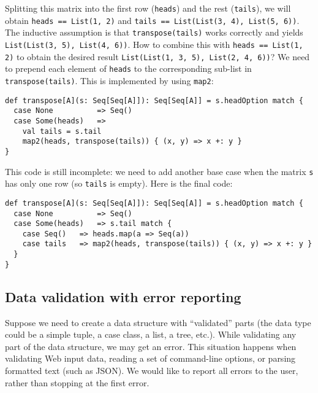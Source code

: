 Splitting this matrix into the first row (\lstinline!heads!) and
the rest (\lstinline!tails!), we will obtain \lstinline!heads == List(1, 2)!
and \lstinline!tails == List(List(3, 4), List(5, 6))!. The inductive
assumption is that \lstinline!transpose(tails)! works correctly and
yields \lstinline!List(List(3, 5), List(4, 6))!. How to combine this
with \lstinline!heads == List(1, 2)! to obtain the desired result
\lstinline!List(List(1, 3, 5), List(2, 4, 6))!? We need to prepend
each element of \lstinline!heads! to the corresponding sub-list in
\lstinline!transpose(tails)!. This is implemented by using \lstinline!map2!:
\begin{lstlisting}
def transpose[A](s: Seq[Seq[A]]): Seq[Seq[A]] = s.headOption match {
  case None          => Seq()
  case Some(heads)   =>
    val tails = s.tail
    map2(heads, transpose(tails)) { (x, y) => x +: y }
}
\end{lstlisting}
This code is still incomplete: we need to add another base case when
the matrix \lstinline!s! has only one row (so \lstinline!tails!
is empty). Here is the final code:
\begin{lstlisting}
def transpose[A](s: Seq[Seq[A]]): Seq[Seq[A]] = s.headOption match {
  case None          => Seq()
  case Some(heads)   => s.tail match {
    case Seq()   => heads.map(a => Seq(a))
    case tails   => map2(heads, transpose(tails)) { (x, y) => x +: y }
  }
}
\end{lstlisting}


\subsection{Data validation with error reporting}

Suppose we need to create a data structure with \textsf{``}validated\textsf{''} parts
(the data type could be a simple tuple, a case class, a list, a tree,
etc.). While validating any part of the data structure, we may get
an error. This situation happens when validating Web input data, reading
a set of command-line options, or parsing formatted text (such as
JSON). We would like to report all errors to the user, rather than
stopping at the first error. 

